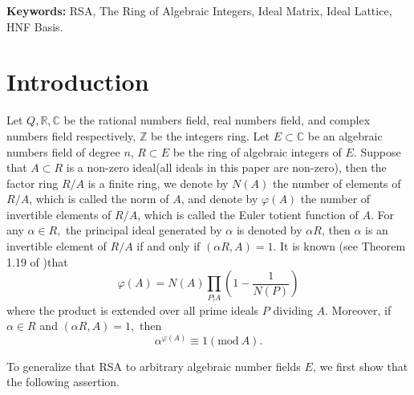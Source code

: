 \documentclass [11pt]{article}
\begin{document}
\vspace{0.4cm}
\noindent \textbf{Keywords:} RSA, The Ring of  Algebraic Integers, Ideal Matrix, Ideal Lattice, HNF Basis.

\newpage
{}
\section{Introduction}

Let $ Q, \mathbb{R},\mathbb{C}$ be the rational numbers field, real numbers field,
and complex numbers field respectively, $ \mathbb{Z}$ be the integers ring. Let $ E \subset \mathbb{C}$ be an algebraic numbers
field of degree $n$, $R \subset E$ be the ring of algebraic integers of $E$. Suppose that $A \subset R$ is a non-zero ideal(all ideals in this paper are non-zero), then the factor ring $R/A$ is a finite ring, we denote by $N(A)$ the number of elements of $R/A$, which is called the norm of $A$,
and denote by $ \varphi(A)$ the number of invertible elements of $R/A$, which is called the Euler totient function of $A$. For any
$\alpha \in R,$ the principal ideal generated by $\alpha$ is denoted by $\alpha R$, then $\alpha$ is an invertible element of $R/A$ if
and only if $(\alpha R,A)=1.$ It is known (see Theorem 1.19 of \cite{N})that
\begin{equation}\label{1.1}
\varphi(A)=N(A)\prod_{P | A}(1-\frac{1}{ N(P)})
\end{equation}
where the product is extended over all prime ideals $P$ dividing $A$. Moreover, if $\alpha \in R$ and $ (\alpha R,A)=1,$ then
\begin{equation}\label{1.2}
\alpha^{\varphi(A)}\equiv 1(\text{mod}\  A).
\end{equation}

To generalize that RSA to arbitrary algebraic number fields $E$, we first show that the following assertion.
\end{document}
